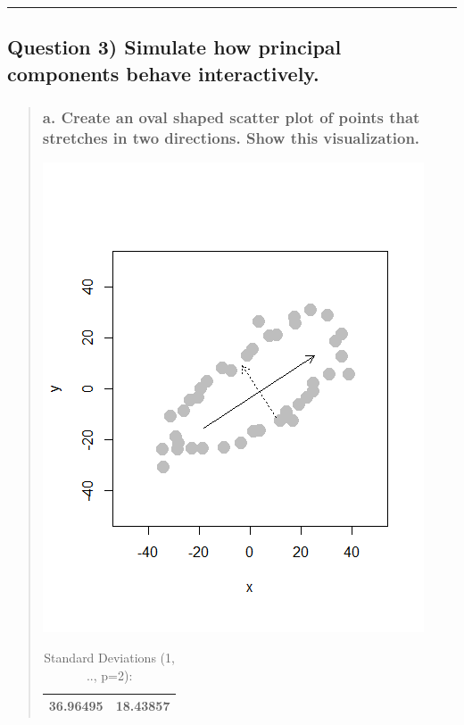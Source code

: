\documentclass[
]{article}
\begin{document}
\begin{center}\rule{0.5\linewidth}{0.5pt}\end{center}

\hypertarget{question-3-simulate-how-principal-components-behave-interactively.}{%
\subsection{Question 3) Simulate how principal components behave
interactively.}\label{question-3-simulate-how-principal-components-behave-interactively.}}

\begin{quote}
\hypertarget{a.-create-an-oval-shaped-scatter-plot-of-points-that-stretches-in-two-directions.-show-this-visualization.}{%
\subsubsection{a. Create an oval shaped scatter plot of points that
stretches in two directions. Show this
visualization.}\label{a.-create-an-oval-shaped-scatter-plot-of-points-that-stretches-in-two-directions.-show-this-visualization.}}

\includegraphics{images/PCA1.png}

\begin{longtable}[]{@{}ll@{}}
\caption{Standard Deviations (1, .., p=2):}\tabularnewline
\toprule
\endhead
36.96495 & 18.43857 \\
\bottomrule
\end{longtable}


\end{quote}
\end{document}
